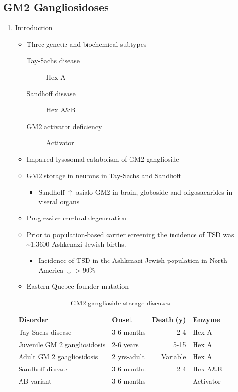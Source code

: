 \documentclass{scrartcl}
\begin{document}
\subsection{GM2 Gangliosidoses}
\label{sec:org5ca6bad}
\begin{enumerate}
\item Introduction
\label{sec:org903d7b3}
\begin{itemize}
\item Three genetic and biochemical subtypes
\begin{description}
\item[{Tay-Sachs disease}] Hex A
\item[{Sandhoff disease}] Hex A\&B
\item[{GM2 activator deficiency}] Activator
\end{description}
\item Impaired lysosomal catabolism of GM2 ganglioside
\item GM2 storage in neurons in Tay-Sachs and Sandhoff
\begin{itemize}
\item Sandhoff \(\uparrow\) asialo-GM2 in brain, globoside and oligosacarides in viseral organs
\end{itemize}
\item Progressive cerebral degeneration
\item Prior to population-based carrier screening the incidence of TSD was \textasciitilde{}1:3600 Ashkenazi Jewish births.
\begin{itemize}
\item Incidence of TSD in the Ashkenazi Jewish population in North America \(\downarrow\) > 90\%
\end{itemize}
\item Eastern Quebec founder mutation
\end{itemize}

\begin{table}[htbp]
\caption{\label{tab:org7a029d9}
GM2 ganglioside storage diseases}
\centering
\begin{tabular}{llrl}
Disorder & Onset & Death (y) & Enzyme\\
\hline
Tay-Sachs disease & 3-6 months & 2-4 & Hex A\\
Juvenile GM 2 gangliosidosis & 2-6 years & 5-15 & Hex A\\
Adult GM 2 gangliosidosis & 2 yrs-adult & Variable & Hex A\\
\hline
Sandhoff disease & 3-6 months & 2-4 & Hex A\&B\\
AB variant & 3-6 months &  & Activator\\
\end{tabular}
\end{table}


\end{enumerate}
\end{document}
